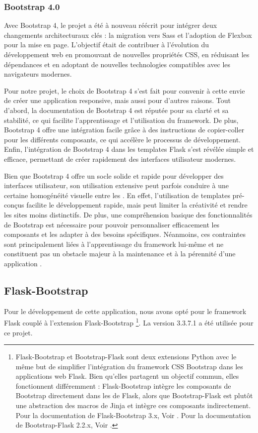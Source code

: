         \subsubsection{Bootstrap 4.0}
        
        Avec Bootstrap 4, le projet a été à nouveau réécrit pour intégrer deux changements architecturaux clés : la migration vers Sass et l'adoption de Flexbox pour la mise en page. L'objectif était de contribuer à l'évolution du développement web en promouvant de nouvelles propriétés CSS, en réduisant les dépendances et en adoptant de nouvelles technologies compatibles avec les navigateurs modernes.

        Pour notre projet, le choix de Bootstrap 4 s'est fait pour convenir à cette envie de créer une application responsive, mais aussi pour d'autres raisons. Tout d'abord, la documentation de Bootstrap 4 est réputée pour sa clarté et sa stabilité, ce qui facilite l'apprentissage et l'utilisation du framework. De plus, Bootstrap 4 offre une intégration facile grâce à des instructions de copier-coller pour les différents composants, ce qui accélère le processus de développement. Enfin, l'intégration de Bootstrap 4 dans les templates Flask s'est révélée simple et efficace, permettant de créer rapidement des interfaces utilisateur modernes.
        
        Bien que Bootstrap 4 offre un socle solide et rapide pour développer des interfaces utilisateur, son utilisation extensive peut parfois conduire à une certaine homogénéité visuelle entre les . En effet, l'utilisation de templates pré-conçus facilite le développement rapide, mais peut limiter la créativité et rendre les sites moins distinctifs. De plus, une compréhension basique des fonctionnalités de Bootstrap est nécessaire pour pouvoir personnaliser efficacement les composants et les adapter à des besoins spécifiques. Néanmoins, ces contraintes sont principalement liées à l'apprentissage du framework lui-même et ne constituent pas un obstacle majeur à la maintenance et à la pérennité d'une application .
    
            \subsection{Flask-Bootstrap}
             Pour le développement de cette application, nous avons opté pour le framework Flask couplé à l'extension Flask-Bootstrap \footnote{Flask-Bootstrap et Bootstrap-Flask sont deux extensions Python avec le même but de simplifier l'intégration du framework CSS Bootstrap dans les applications web Flask. Bien qu'elles partagent un objectif commun, elles fonctionnent différemment : Flask-Bootstrap intègre les composants de Bootstrap directement dans les  de Flask, alors que Bootstrap-Flask est plutôt une abstraction des macros de Jinja et intègre ces composants indirectement. Pour la documentation de Flask-Bootstrap 3.x, Voir \cite{flask_bootstrap}. Pour la documentation de Bootstrap-Flask 2.2.x, Voir \cite{bootstrap_flask}.}. La version 3.3.7.1 a été utilisée pour ce projet.
             
